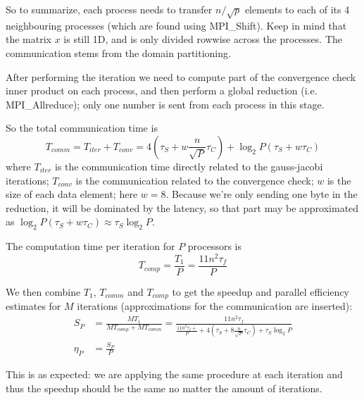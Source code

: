 So to summarize, each process needs to transfer $n/\sqrt{p}$ elements to each of its 4 neighbouring processes (which are found using MPI\_Shift). Keep in mind that the matrix $x$ is still 1D, and is only divided rowwise across the processes. The communication stems from the domain partitioning.

After performing the iteration we need to compute part of the convergence check inner product on each process, and then perform a global reduction (i.e. MPI\_Allreduce); only one number is sent from each process in this stage.

So the total communication time is
\begin{equation}
  T_{comm} = T_{iter} + T_{conv}
           = 4 \left( \tau_S + w \frac{n}{\sqrt{P}} \tau_C \right)
           + \log_2 P \left( \tau_S + w\tau_C \right)
\end{equation}
where $T_{iter}$ is the communication time directly related to the gauss-jacobi iterations; $T_{conv}$ is the communication related to the convergence check; $w$ is the size of each data element; here $w=8$. Because we're only sending one byte in the reduction, it will be dominated by the latency, so that part may be approximated as $\log_2 P \left( \tau_S + w\tau_C \right) \approx \tau_S \log_2 P$.

The computation time per iteration for $P$ processors is
\begin{equation}
  T_{comp} = \frac{T_1}{P} = \frac{11n^2 \tau_f}{P}
\end{equation}

We then combine $T_1$, $T_{comm}$ and $T_{comp}$ to get the speedup and parallel efficiency estimates for $M$ iterations (approximations for the communication are inserted):
\begin{align*}
  S_P &= \frac{MT_1}{MT_{comp} + MT_{comm}} = \frac{11n^2 \tau_f}{\frac{11n^2 \tau_f + }{P} + 4 \left( \tau_S + 8 \frac{n}{\sqrt{P}} \tau_C \right)
           + \tau_S\log_2 P } \\
  \eta_P &= \frac{S_P}{P}
\end{align*}

This is as expected: we are applying the same procedure at each iteration and thus the speedup should be the same no matter the amount of iterations.
















